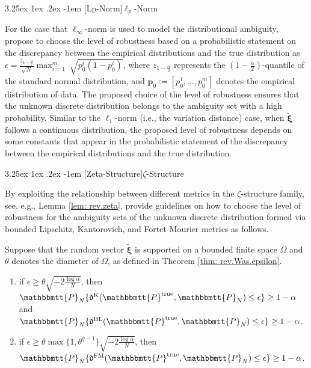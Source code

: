 \documentclass[final,onefignum,onetabnum]{class}
\makeatletter
\renewcommand\paragraph{\@startsection{paragraph}{4}{\z@}%
  {3.25ex \@plus1ex \@minus.2ex}%
  {-1em}%
  {\normalfont\normalsize\bfseries}}
\newcommand{\bs}[1]{\boldsymbol{#1}} %
\newcommand{\Ts}[1]{\mathbbmtt{#1}} %
\newcommand{\Fs}[1]{\mathfrak{#1}} %
\newcommand{\txi}{\tilde{\bs{\xi}}}
\newcommand{\trueP}{\Ts{P}^{\text{true}}}
\newcommand{\nomp}{p_{0}}
\makeatother
\begin{document}
\paragraph[Lp-Norm]{\texorpdfstring{$\ell_{p}$-Norm}{Lp-Norm}}


For the case that  $\ell_{\infty}$-norm  is used to model the distributional ambiguity, \citet{jiang2018} propose to choose the level of robustness based on a probabilistic statement on the discrepancy between the empirical distributions and the true distribution as $\epsilon=\frac{z_{1-\frac{\alpha}{2}}}{\sqrt{N}}\max_{i=1}^{m} \ \sqrt{\nomp^{i}(1-\nomp^{i})}$, where $z_{1-\frac{\alpha}{2}}$ represents the $(1-\frac{\alpha}{2})$-quantile of the standard normal distribution, and $\bs{p}_{0}:=[\nomp^{1}, \ldots, \nomp^{m}]$ denotes the empirical distribution of data. 
The proposed choice of the level of robustness ensures that the unknown discrete distribution belongs to the ambiguity set with a high probability.  Similar to the $\ell_{1}$-norm (i.e., the variation distance) case, when $\txi$ follows a  continuous distribution, the proposed level of robustness depends on some constants that appear in the probabilistic statement of the discrepancy between the empirical distributions and the true distribution. 


\paragraph[Zeta-Structure]{\texorpdfstring{$\zeta$-Structure}{Zeta-Structure}}

By exploiting the relationship between different metrics in the $\zeta$-structure family, see, e.g., Lemma \ref{lem: rev.zeta}, \citet{zhao2015} provide guidelines on how to choose the level of robustness for the ambiguity sets of the unknown discrete distribution formed via bounded Lipschitz, Kantorovich, and Fortet-Mourier metrics as follows. 
\begin{theorem}
    \label{thm: rev.zeta.epsilon}
    Suppose that the random vector $\txi$ is supported on a bounded finite  space $\Omega$ and $\theta$ denotes the diameter of $\Omega$, as defined in Theorem \ref{thm: rev.Was.epsilon}. 
    \begin{enumerate}[label=(\roman*)]
        \item if $\epsilon \ge \theta \sqrt{-2 \frac{\log \alpha}{N} }$, then 
    $\Ts{P}_{N}\{\Fs{d}^{\text{K}} (\trueP, \Ts{P}_{N}) \le \epsilon \} \ge 1-\alpha$ and \linebreak $\Ts{P}_{N}\{\Fs{d}^{\text{BL}} (\trueP, \Ts{P}_{N}) \le \epsilon \} \ge 1-\alpha$. 
    
        \item if $\epsilon \ge \theta \max\{1, \theta^{q-1}\} \sqrt{-2 \frac{\log \alpha}{N} }$, then 
    $\Ts{P}_{N}\{\Fs{d}^{\text{FM}} (\trueP, \Ts{P}_{N}) \le \epsilon \} \ge 1-\alpha$. 
    \end{enumerate}
\end{theorem}
\end{document}
